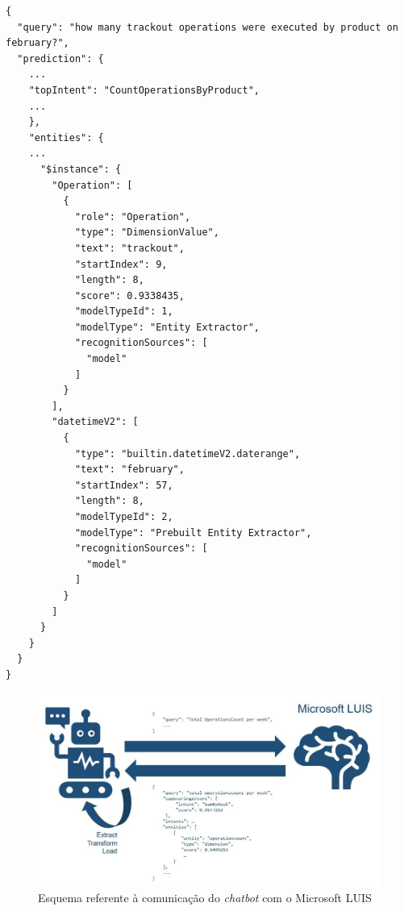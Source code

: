 \begin{lstlisting}[language={},caption={Excerto do JSON devolvido pelo Microsoft LUIS},numbers=none,label=lst:luisresult,basicstyle=\scriptsize]
{
  "query": "how many trackout operations were executed by product on february?",
  "prediction": {
    ...
    "topIntent": "CountOperationsByProduct",
    ...
    },
    "entities": {
    ...
      "$instance": {
        "Operation": [
          {
            "role": "Operation",
            "type": "DimensionValue",
            "text": "trackout",
            "startIndex": 9,
            "length": 8,
            "score": 0.9338435,
            "modelTypeId": 1,
            "modelType": "Entity Extractor",
            "recognitionSources": [
              "model"
            ]
          }
        ],
        "datetimeV2": [
          {
            "type": "builtin.datetimeV2.daterange",
            "text": "february",
            "startIndex": 57,
            "length": 8,
            "modelTypeId": 2,
            "modelType": "Prebuilt Entity Extractor",
            "recognitionSources": [
              "model"
            ]
          }
        ]
      }
    }
  }
}
\end{lstlisting}
%
\begin{figure}
    \centering
    \includegraphics[width=.85\textwidth]{ch05/assets/prototype-implementation.jpg}
    \caption{Esquema referente à comunicação do \textit{chatbot} com o Microsoft LUIS}
    \label{fig:prototype_implementation}
\end{figure}

